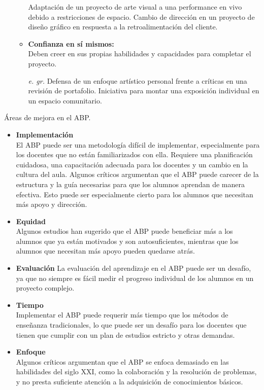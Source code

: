 \begin{itemize}
\begin{itemize}
      Adaptación de un proyecto de arte visual a una performance en vivo debido a restricciones de espacio. Cambio de dirección en un proyecto de diseño gráfico en respuesta a la retroalimentación del cliente.
      \item \textbf{Confianza en sí mismos:}\\
      Deben creer en sus propias habilidades y capacidades para completar el proyecto.
      \item[\textit{e. gr.}]
      Defensa de un enfoque artístico personal frente a críticas en una revisión de portafolio. Iniciativa para montar una exposición individual en un espacio comunitario.
    \end{itemize}
\end{itemize}
Áreas de mejora en el ABP. 
\begin{itemize}
    \item \textbf{Implementación }\\
    El ABP puede ser una metodología difícil de implementar, especialmente para los docentes que no están familiarizados con ella. Requiere una planificación cuidadosa, una capacitación adecuada para los docentes y un cambio en la cultura del aula.  Algunos críticos argumentan que el ABP puede carecer de la estructura y la guía necesarias para que los alumnos aprendan de manera efectiva. Esto puede ser especialmente cierto para los alumnos que necesitan más apoyo y dirección.
    \item \textbf{Equidad}\\
    Algunos estudios han sugerido que el ABP puede beneficiar más a los alumnos que ya están motivados y son autosuficientes, mientras que los alumnos que necesitan más apoyo pueden quedarse atrás.
    \item \textbf{Evaluación}
    La evaluación del aprendizaje en el ABP puede ser un desafío, ya que no siempre es fácil medir el progreso individual de los alumnos en un proyecto complejo.
    \item \textbf{Tiempo}\\
     Implementar el ABP puede requerir más tiempo que los métodos de enseñanza tradicionales, lo que puede ser un desafío para los docentes que tienen que cumplir con un plan de estudios estricto y otras demandas.
    \item \textbf{Enfoque}\\
    Algunos críticos argumentan que el ABP se enfoca demasiado en las habilidades del siglo XXI, como la colaboración y la resolución de problemas, y no presta suficiente atención a la adquisición de conocimientos básicos.
\end{itemize}








